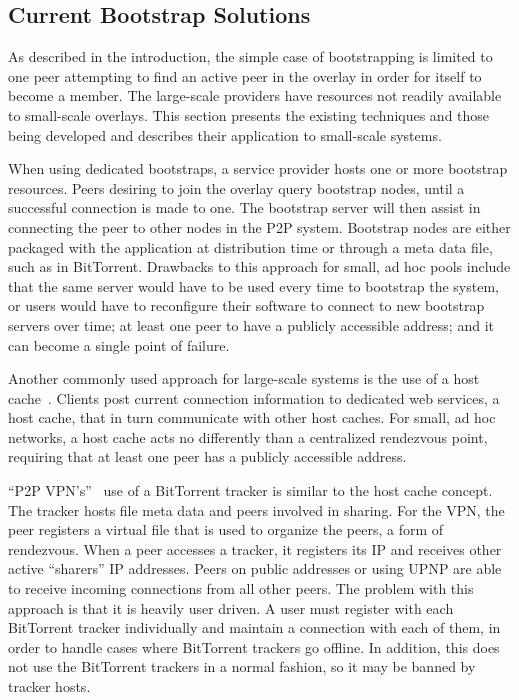 \documentclass[conference]{IEEEtran}
\begin{document}
\subsection{Current Bootstrap Solutions}

As described in the introduction, the simple case of bootstrapping is limited
to one peer attempting to find an active peer in the overlay in order for
itself to become a member.  The large-scale providers have resources not
readily available to small-scale overlays.  This section presents the existing
techniques and those being developed and describes their application to
small-scale systems.

When using dedicated bootstraps, a service provider hosts one or more bootstrap
resources.  Peers desiring to join the overlay query bootstrap nodes, until a
successful connection is made to one.  The bootstrap server will then assist in
connecting the peer to other nodes in the P2P system.  Bootstrap nodes are
either packaged with the application at distribution time or through a meta
data file, such as in BitTorrent.  Drawbacks to this approach for small, ad hoc
pools include that the same server would have to be used every time to
bootstrap the system, or users would have to reconfigure their software to
connect to new bootstrap servers over time; at least one peer to have a
publicly accessible address; and it can become a single point of failure.

Another commonly used approach for large-scale systems is the use of a host
cache~\cite{host_cache}.  Clients post current connection information to
dedicated web services, a host cache, that in turn communicate with other host
caches.  For small, ad hoc networks, a host cache acts no differently than a
centralized rendezvous point, requiring that at least one peer has a publicly
accessible address.

``P2P VPN's''~\cite{p2pvpn} use of a BitTorrent tracker is similar to the host
cache concept.  The tracker hosts file meta data and peers involved in sharing.
For the VPN, the peer registers a virtual file that is used to organize the
peers, a form of rendezvous.  When a peer accesses a tracker, it registers its
IP and receives other active ``sharers'' IP addresses.  Peers on public
addresses or using UPNP are able to receive incoming connections from all other
peers.  The problem with this approach is that it is heavily user driven.  A
user must register with each BitTorrent tracker individually and maintain a
connection with each of them, in order to handle cases where BitTorrent
trackers go offline.  In addition, this does not use the BitTorrent trackers in
a normal fashion, so it may be banned by tracker hosts.
\end{document}
